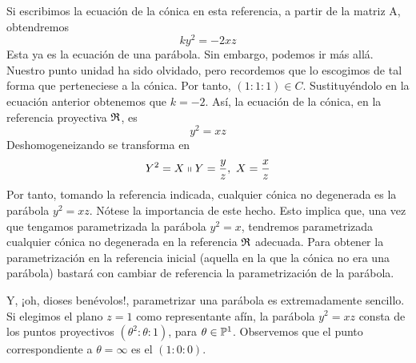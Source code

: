 Si escribimos la ecuación de la cónica en esta referencia, a partir de la matriz A, obtendremos
\begin{equation*}
	ky^2=-2xz
\end{equation*}
Esta ya es la ecuación de una parábola. Sin embargo, podemos ir más allá. Nuestro punto unidad ha sido olvidado, pero recordemos que lo escogimos de tal forma que perteneciese a la cónica. Por tanto, $(1:1:1)\in C$. Sustituyéndolo en la ecuación anterior obtenemos que $k=-2$. Así, la ecuación de la cónica, en la referencia proyectiva $\mathfrak{R}$, es
\begin{equation}
	y^2=xz
\end{equation}
Deshomogeneizando se transforma en 
\begin{equation}
	Y^2=X \shortparallel Y=\frac{y}{z}, \ X=\frac{x}{z}
\end{equation}
Por tanto, tomando la referencia indicada, cualquier cónica no degenerada es la parábola $y^2=xz$. Nótese la importancia de este hecho. Esto implica que, una vez que tengamos parametrizada la parábola $y^2=x$, tendremos parametrizada cualquier cónica no degenerada en la referencia $\mathfrak{R}$ adecuada. Para obtener la parametrización en la referencia inicial (aquella en la que la cónica no era una parábola) bastará con cambiar de referencia la parametrización de la parábola.

Y, ¡oh, dioses benévolos!, parametrizar una parábola es extremadamente sencillo. Si elegimos el plano $z=1$ como representante afín, la parábola $y^2=xz$ consta de los puntos proyectivos $(\theta^2:\theta:1)$, para $\theta\in \mathbb{P}^1$. Observemos que el punto correspondiente a $\theta=\infty$ es el $(1:0:0)$.

